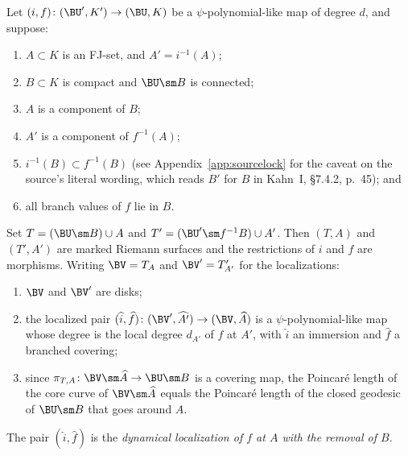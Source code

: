 \begin{proposition}\label{prop:kahn-dynamical-localization}
Let \((i,f)\colon(\BU',K')\to(\BU,K)\) be a \(\psi\)-polynomial-like
map of degree \(d\), and suppose:
\begin{enumerate}
\item \(A\subset K\) is an FJ-set, and \(A'=i^{-1}(A)\);
\item \(B\subset K\) is compact and \(\BU\sm B\) is connected;
\item \(A\) is a component of \(B\);
\item \(A'\) is a component of \(f^{-1}(A)\);
\item \(i^{-1}(B)\subset f^{-1}(B)\) (see Appendix~\ref{app:sourcelock}
for the caveat on the source's literal wording, which reads \(B'\) for
\(B\) in Kahn~I, \S7.4.2, p.~45); and
\item all branch values of \(f\) lie in \(B\).
\end{enumerate}
Set \(T=(\BU\sm B)\cup A\) and \(T'=(\BU'\sm f^{-1}B)\cup A'\).  Then
\((T,A)\) and \((T',A')\) are marked Riemann surfaces and the
restrictions of \(i\) and \(f\) are morphisms.  Writing \(\BV=T_A\)
and \(\BV'=T'_{A'}\) for the localizations:
\begin{enumerate}
\item[(a)] \(\BV\) and \(\BV'\) are disks;
\item[(b)] the localized pair
\((\widehat i,\widehat f)\colon(\BV',\widehat{A'})\to(\BV,\widehat A)\)
is a \(\psi\)-polynomial-like map whose degree is the local degree
\(d_{A'}\) of \(f\) at \(A'\), with \(\widehat i\) an immersion and
\(\widehat f\) a branched covering;
\item[(c)] since
\(\pi_{T,A}\colon\BV\sm\widehat A\to\BU\sm B\) is a covering map, the
Poincar\'e length of the core curve of \(\BV\sm\widehat A\) equals the
Poincar\'e length of the closed geodesic of \(\BU\sm B\) that goes
around \(A\).
\end{enumerate}
The pair \((\widehat i,\widehat f)\) is the \emph{dynamical
localization of \(f\) at \(A\) with the removal of \(B\)}.
\end{proposition}

